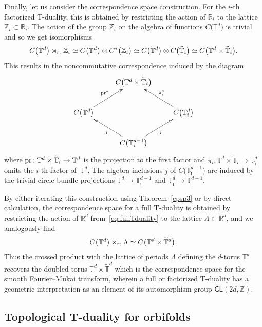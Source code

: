 \documentclass[pdftex]{sigma}
\numberwithin{equation}{section}
\newcommand{\sfGL}{\mathsf{GL}}
\newcommand{\rt}{{\rm rt}}
\newcommand{\zed}{{\mathbb Z}} %
\newcommand{\real}{{\mathbb R}} %
\newcommand{\torus}{{\mathbb T}} %
\begin{document}
Finally, let us consider the correspondence space construction. For
the $i$-th factorized T-duality, this is obtained by restricting the action of
$\real_i$ to the lattice $\zed_i\subset\real_i$. The action of the
group $\zed_i$ on the algebra of functions $C\big(\torus^d\big)$ is trivial and
so we get isomorphisms
\[
C\big(\torus^d\big)\rtimes_\rt\zed_i \simeq
C\big(\torus^d\big)\otimes C^*\big(\zed_i\big) \simeq
 C\big(\torus^d\big)\otimes C\big(\widetilde\torus_i\big) \simeq
 C\big(\torus^d\times\widetilde\torus_i\big) .
\]
This results in the noncommutative correspondence induced by the diagram
\[
\xymatrix{
 & C\big(\torus^d\times\widetilde\torus_i\big) & \\
C\big(\torus^d\big) \ar[ur]^{{\rm pr}^*} & &
C\big(\torus^d_{\tilde\imath}\big)
\ar[ul]_{\pi_i^*} \\
 & C\big(\torus^{d-1}_{\hat\imath}\big) \ar[ur]_{j} \ar[ul]^{j} &
}
\]
where ${\rm pr}\colon \torus^d\times\widetilde\torus_i\to\torus^d$ is the
projection to the first factor and
$\pi_i\colon \torus^d\times\widetilde\torus_i\to\torus^d_{\tilde\imath}$
omits the $i$-th factor of~$\torus^d$. The algebra inclusions $j$ of
$C\big(\torus^{d-1}_{\hat\imath}\big)$ are induced by the trivial
circle bundle projections $\torus^d\to \torus^{d-1}_{\hat\imath}$ and
$\torus^d_{\tilde\imath}\to \torus^{d-1}_{\hat\imath}$.

By either iterating this construction using Theorem~\ref{cpsp3} or by
direct calculation, the correspondence space for a full T-duality is
obtained by restricting the action of
$\real^d$ from~\eqref{eq:fullTduality} to the lattice
$\Lambda\subset\real^d$, and we analogously find
\begin{gather*}%
C\big(\torus^d\big)\rtimes_\rt\Lambda \simeq
C\big(\torus^d\times\widetilde\torus{}^d\big) .
\end{gather*}
Thus the crossed product with the lattice of periods $\Lambda$
defining the $d$-torus $\torus^d$ recovers the doubled torus
$\torus^d\times\widetilde\torus^d$ which is the correspondence space
for the smooth Fourier--Mukai transform, wherein a full or factorized T-duality has a geometric interpretation as
an element of its automorphism group $\sfGL(2d,\zed)$.

\subsection{Topological T-duality for orbifolds}\label{sec:TopTorb}
\end{document}
